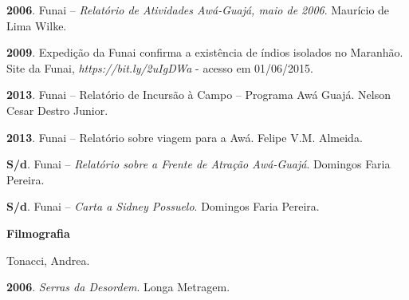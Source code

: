 \textbf{2006}. Funai -- \emph{Relatório de Atividades Awá-Guajá, maio de
2006}. Maurício de Lima Wilke.

\textbf{2009}. Expedição da Funai confirma a existência de índios
isolados no Maranhão. Site da Funai,
\emph{https://bit.ly/2uIgDWa} - acesso em 01/06/2015.

\textbf{2013}. Funai -- Relatório de Incursão à Campo -- Programa Awá
Guajá. Nelson Cesar Destro Junior.

\textbf{2013}. Funai -- Relatório sobre viagem para a  Awá. Felipe V.M.
Almeida.

\textbf{S/d}. Funai -- \emph{Relatório sobre a Frente de Atração
Awá-Guajá}. Domingos Faria Pereira.

\textbf{S/d}. Funai -- \emph{Carta a Sidney Possuelo}. Domingos Faria
Pereira.

\textbf{Filmografia}

Tonacci, Andrea.

\textbf{2006}. \emph{Serras da Desordem}. Longa Metragem.
